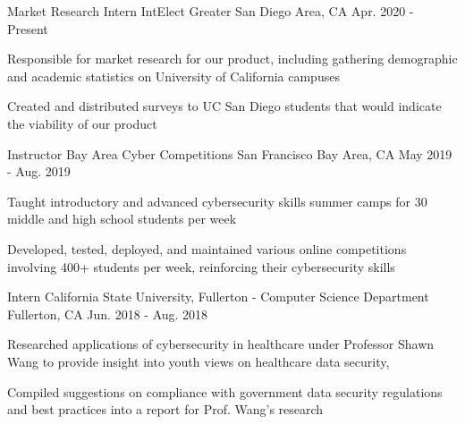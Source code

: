 

\begin{cventries}

\cventry
{Market Research Intern} %
{IntElect} %
{Greater San Diego Area, CA} %
{Apr. 2020 - Present} %
{
  \begin{cvitems} %
    \item {Responsible for market research for our product, including gathering demographic and academic statistics on University of California campuses}
    \item {Created and distributed surveys to UC San Diego students that would indicate the viability of our product}
  \end{cvitems}
}

  \cventry
    {Instructor} %
    {Bay Area Cyber Competitions} %
    {San Francisco Bay Area, CA} %
    {May 2019 - Aug. 2019} %
    {
      \begin{cvitems} %
        \item {Taught introductory and advanced cybersecurity skills summer camps for 30 middle and high school students per week}
        \item {Developed, tested, deployed, and maintained various online competitions involving 400+ students per week, reinforcing their cybersecurity skills}
      \end{cvitems}
    }

  \cventry
    {Intern} %
    {California State University, Fullerton - Computer Science Department} %
    {Fullerton, CA} %
    {Jun. 2018 - Aug. 2018} %
    {
      \begin{cvitems} %
        \item {Researched applications of cybersecurity in healthcare under Professor Shawn Wang to provide insight into youth views on healthcare data security,}
        \item {Compiled suggestions on compliance with government data security regulations and best practices into a report for Prof. Wang's research}
      \end{cvitems}
    }

\end{cventries}
